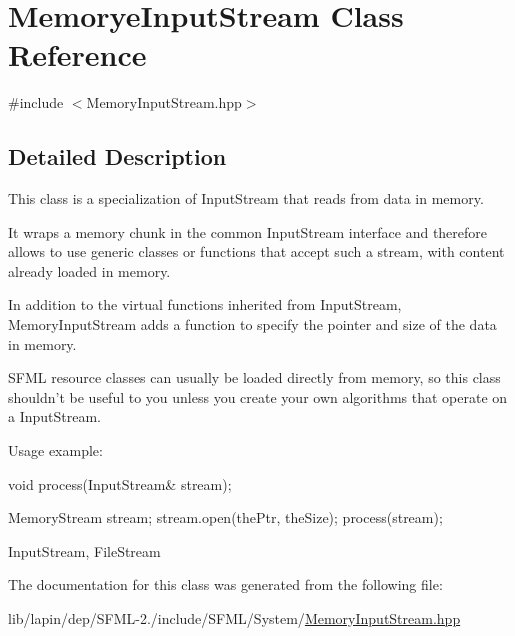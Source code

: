 \hypertarget{class_memorye_input_stream}{\section{Memorye\-Input\-Stream Class Reference}
\label{class_memorye_input_stream}
}


{\ttfamily \#include $<$Memory\-Input\-Stream.\-hpp$>$}



\subsection{Detailed Description}
This class is a specialization of Input\-Stream that reads from data in memory.

It wraps a memory chunk in the common Input\-Stream interface and therefore allows to use generic classes or functions that accept such a stream, with content already loaded in memory.

In addition to the virtual functions inherited from Input\-Stream, Memory\-Input\-Stream adds a function to specify the pointer and size of the data in memory.

S\-F\-M\-L resource classes can usually be loaded directly from memory, so this class shouldn't be useful to you unless you create your own algorithms that operate on a Input\-Stream.

Usage example\-: 
\begin{DoxyCode}
\textcolor{keywordtype}{void} process(InputStream& stream);

MemoryStream stream;
stream.open(thePtr, theSize);
process(stream);
\end{DoxyCode}


Input\-Stream, File\-Stream 

The documentation for this class was generated from the following file\-:\begin{DoxyCompactItemize}
\item 
lib/lapin/dep/\-S\-F\-M\-L-\/2./include/\-S\-F\-M\-L/\-System/\hyperlink{lapin_2dep_2_s_f_m_l-2_83_2include_2_s_f_m_l_2_system_2_memory_input_stream_8hpp}{Memory\-Input\-Stream.\-hpp}\end{DoxyCompactItemize}
